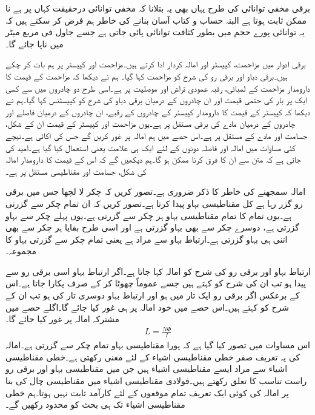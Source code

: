 برقی مخفی توانائی کی طرح یہاں بھی یہ بتلانا کہ مخفی توانائی درحقیقت کہاں پر ہے نا ممکن ثابت ہوتا ہے البتہ حساب و کتاب آسان بنانے کی خاطر ہم فرض کر سکتے ہیں کہ یہ توانائی پورے حجم میں بطور کثافت توانائی  پائی جاتی ہے جسے جاول فی مربع میٹر  میں ناپا جائے گا۔


برقی ادوار میں مزاحمت، کپیسٹر اور امالہ کردار ادا کرتے ہیں۔مزاحمت اور کپیسٹر پر ہم بات کر چکے ہیں۔برقی دباو اور برقی رو کی شرح کو مزاحمت کہا گیا۔ ہم نے دیکھا کہ مزاحمت کے قیمت کا دارومدار مزاحمت کے لمبائی، رقبہ عمودی تراش اور موصلیت پر ہے۔اسی طرح دو چادروں میں سے کسی ایک پر بار کی حتمی قیمت اور ان چادروں  کے درمیان برقی دباو کی شرح کو کپیسٹنس کہا گیا۔ہم نے دیکھا کہ کپیسٹر کے قیمت کا دارومدار کپیسٹر کے چادروں کے رقبے، ان چادروں کے درمیان فاصلے اور چادروں کے درمیان مادے کی برقی مستقل پر ہے۔یوں مزاحمت اور کپیسٹر کے قیمت ان کے شکل، جسامت اور مادے کے مستقل پر ہے۔اس حصے میں ہم امالہ  پر غور کریں گے جس کی اکائی   ہے۔نیچے کئی مساوات میں امالہ اور فاصلہ دونوں کے لئے ایک ہی علامت یعنی  استعمال کیا گیا ہے۔امید کی جاتی ہے کہ متن سے ان کا فرق کرنا ممکن ہو گا۔ہم دیکھیں گے کہ اس کے قیمت کا دارومدار امالہ کی شکل، جسامت اور مقناطیسی مستقل پر ہے۔ 

امالہ سمجھنے کی خاطر  کا ذکر ضروری ہے۔تصور کریں کہ  چکر لا لچھا جس میں  برقی رو گزر رہا ہے کل  مقناطیسی بہاو پیدا کرتا ہے۔تصور کریں کہ  ان تمام  چکر سے گزرتی ہے۔یوں تمام کا تمام مقناطیسی بہاو ہر چکر سے گزرتی ہے۔یوں پہلے چکر سے  بہاو گزرتی ہے، دوسرے چکر سے بھی  بہاو گزرتی ہے اور اسی طرح بقایا ہر چکر سے بھی اتنی ہی بہاو گزرتی ہے۔ارتباط بہاو سے مراد  ہے یعنی تمام چکر سے گزرتی بہاو کا مجموعہ۔

ارتباط بہاو اور برقی رو کی شرح کو امالہ کہا جاتا ہے۔اگر ارتباط بہاو اسی برقی رو سے پیدا ہو تب ان کی شرح کو  کہتے ہیں جسے عموماً چھوٹا کر کے صرف  پکارا جاتا ہے۔اس کے برعکس اگر برقی رو ایک تار میں ہو اور ارتباط بہاو دوسری تار کی ہو تب ان کے شرح کو  کہتے ہیں۔اس حصے میں خود امالہ پر ہی غور کیا جائے گا۔اگلے حصے میں مشترکہ امالہ پر غور کیا جائے گا۔ 
\begin{align}
L=\frac{N \Phi}{I}
\end{align}
اس مساوات میں تصور کیا گیا ہے کہ پورا مقناطیسی بہاو تمام چکر سے گزرتی ہے۔امالہ کی یہ تعریف صفر خطی مقناطیسی اشیاء کے لئے معنی رکھتی ہے۔خطی مقناطیسی اشیاء سے مراد ایسے مقناطیسی اشیاء ہیں جن میں مقناطیسی بہاو اور برقی رو راست تناسب کا تعلق رکھتے ہیں۔فولادی مقناطیسی اشیاء میں مقناطیسی چال کی بنا پر امالہ کی کوئی ایک تعریف تمام موقعوں کے لئے کارآمد ثابت نہیں ہوتا۔ہم خطی مقناطیسی اشیاء تک ہی بحث کو محدود رکھیں گے۔

